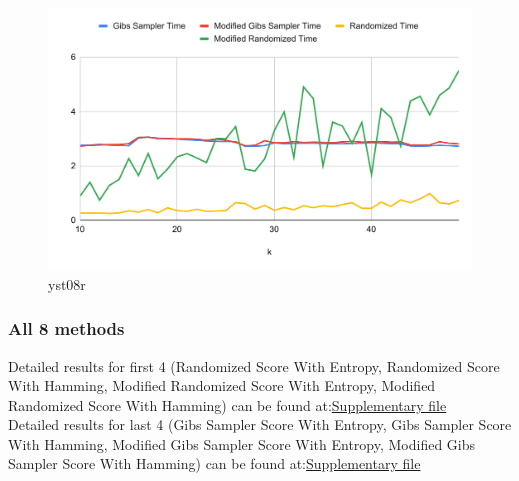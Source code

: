 \documentclass{article}
\begin{document}
\begin{figure}[!hptb]
    \centering
    \includegraphics[scale=0.7]{Figs/chart_time_yst08r.pdf}
    \caption{yst08r}    
\end{figure}
\clearpage
\subsubsection{All 8 methods}
Detailed results for first 4 (Randomized Score With Entropy, Randomized Score With Hamming, Modified Randomized Score With Entropy, Modified Randomized Score With Hamming) can be found at:\href{https://docs.google.com/spreadsheets/d/1NLuWuYod4BafkorDmi3lj8y2_z9ZDeY42Y-eZODlBIA/edit#gid=1072118824}{Supplementary file}\\
Detailed results for last 4 (Gibs Sampler Score With Entropy, Gibs Sampler Score With Hamming, Modified Gibs Sampler Score With Entropy, Modified Gibs Sampler Score With Hamming) can be found at:\href{https://docs.google.com/spreadsheets/d/1NLuWuYod4BafkorDmi3lj8y2_z9ZDeY42Y-eZODlBIA/edit#gid=1219346959}{Supplementary file}
\end{document}
